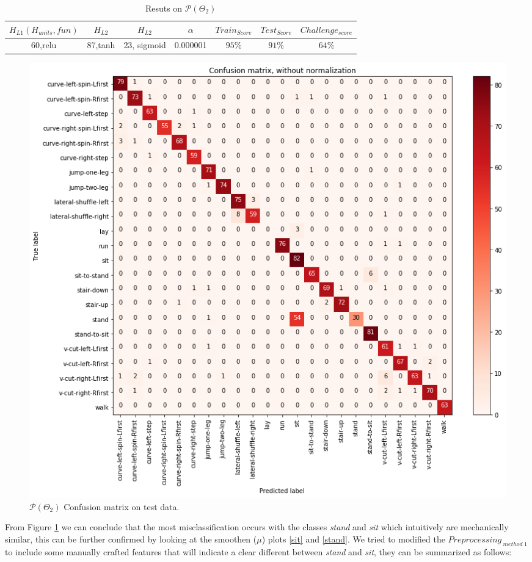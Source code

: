 \begin{table}[h!]
	\begin{center}
		\begin{tabular}{||c c c c c c c||}
			\hline
			$H_{L1}(H_{units},fun)$&$H_{L2}$&$H_{L2}$& $\alpha$ & $Train_{Score}$ & $Test_{Score}$  & $Challenge_{score}$  \\ [0.5ex]
			\hline
			60,relu
			&
			87,tanh
			&
			23, sigmoid
			&0.000001& $95\%$ & $91\%$ & $64\%$  \\
			\hline
		\end{tabular}
		\caption{Resuts on $\mathcal{P}(\Theta_{2})$}
		\label{table:p2_result}
	\end{center}
\end{table}

\begin{figure}[htpb!]
	\centering
	\includegraphics[width=\textwidth]{images/conf_ma.png}
	\caption{$\mathcal{P}(\Theta_{2})$  Confusion matrix on test data.}
	\label{fig:confusion}
\end{figure}


From Figure \ref{fig:confusion} we can conclude that the most misclassification occurs with the classes \emph{stand} and \emph{sit} which intuitively are mechanically similar, this can be further confirmed by looking at the smoothen ($\mu$) plots \ref{sit} and \ref{stand}. We tried to modified the $Preprocessing_{ \ method \ 1}$ to include some manually crafted features that will indicate a clear different between \emph{stand} and \emph{sit}, they can be summarized as follows:


